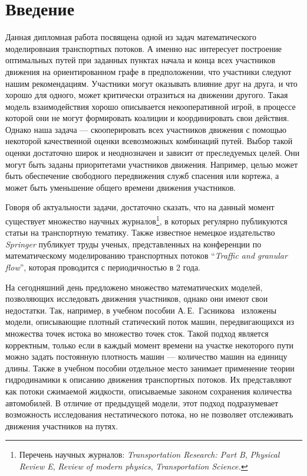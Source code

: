 \documentclass[12pt, a4paper]{article}
\begin{document}
\newpage
\pagestyle{plain}
\tableofcontents{}
\newpage	

\section*{Введение}
Данная дипломная работа посвящена одной из задач математического моделировнаия транспортных потоков. А именно нас интересует построение оптимальных путей при заданных пунктах начала и конца всех участников движения на ориентированном графе в предположении, что участники следуют нашим рекомендациям. Участники могут оказывать влияние друг на друга, и что хорошо для одного, может критически отразиться на движении другого. Такая модель взаимодействия хорошо описывается некооперативной игрой, в процессе которой они не могут формировать коалиции и координировать свои действия. Однако наша задача --- скооперировать всех участников движения с помощью некоторой качественной оценки всевозможных комбинаций путей. Выбор такой оценки достаточно широк и неоднозначен и зависит от преследуемых целей. Они могут быть заданы приоритетами участников движения. Например, целью может быть обеспечение свободного передвижения служб спасения или кортежа, а может быть уменьшение общего времени движения участников.

Говоря об актуальности задачи, достаточно сказать, что на данный момент существует множество научных журналов\footnote{Перечень научных журналов: \textit{Transportation Research: Part B},
	\textit{Physical Review E}, \textit{Review of modern physics}, \textit{Transportation Science.}}, в которых регулярно публикуются статьи на транспортную тематику. Также известное немецкое издательство \textit{Springer} публикует труды ученых, представленных на конференции по математическому моделированию транспортных потоков ``\textit{Traffic and granular flow}'', которая проводится с периодичностью в 2 года.

На сегодняшний день предложено множество математических моделей, позволяющих исследовать движения участников, однако они имеют свои недостатки. Так, например, в учебном пособии А.\,Е.~Гасникова~\cite{book} изложены модели, описывающие плотный статический поток машин, передвигающихся из множества точек истока во множество точек сток. Такой подход является корректным, только если в каждый момент времени на участке некоторого пути можно задать постоянную плотность машин --- количество машин на единицу длины. Также в учебном пособии отдельное место занимает применение теории гидродинамики к описанию движения транспортных потоков. Их представляют как потоки сжимаемой жидкости, описываемые законом сохранения количества автомобилей. В отличие от предыдущей модели, этот подход подразумевает возможность исследования нестатического потока, но не позволяет отслеживать движения участников на путях.
\end{document}
